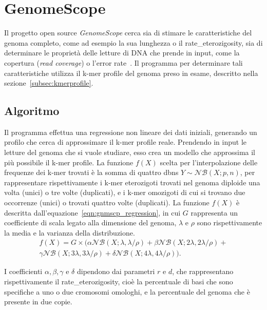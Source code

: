 \documentclass[crop=false, class=book]{standalone}
\begin{document}
	\section{GenomeScope}
	\label{sec:GenomeScope}
	Il progetto open source \textit{GenomeScope} cerca sia di stimare le caratteristiche del genoma completo, come ad esempio la sua lunghezza o il \gls{rate_eterozigosity}, sia di determinare le proprietà delle letture di DNA che prende in input, come la copertura (\textit{read coverage}) o l'error rate~\cite{vurture2017genomescope}. Il programma per determinare tali caratteristiche utilizza il k-mer profile del genoma preso in esame, descritto nella sezione~\vref{subsec:kmerprofile}.
		
	\subsection{Algoritmo}
	Il programma effettua una regressione non lineare dei dati iniziali, generando un profilo che cerca di approssimare il k-mer profile reale. Prendendo in input le letture del genoma che si vuole studiare, esso crea un modello che approssima il più possibile il k-mer profile. La funzione $f(X)$ scelta per l'interpolazione delle frequenze dei k-mer trovati è la somma di quattro \glspl{dbn} $Y \sim \mathcal{NB}(X;p,n)$, per rappresentare rispettivamente i k-mer eterozigoti trovati nel genoma diploide una volta (unici) o tre volte (duplicati), e i k-mer omozigoti di cui si trovano due occorrenze (unici) o trovati quattro volte (duplicati). La funzione $f(X)$ è descritta dall'equazione~\vref{eqn:gnmscp_regression}, in cui $G$ rappresenta un coefficiente di scala legato alla dimensione del genoma, $\lambda$ e $\rho$ sono rispettivamente la media e la varianza della distribuzione.
	\begin{multline}
		f(X) = G \times (\alpha \mathcal{NB}(X;\lambda, \lambda/\rho) + \beta \mathcal{NB}(X;2\lambda, 2\lambda/\rho) + \\
		\gamma \mathcal{NB}(X;3\lambda, 3\lambda/\rho) + \delta \mathcal{NB}(X;4\lambda, 4\lambda/\rho)  ).	
		\label{eqn:gnmscp_regression}
	\end{multline}

	I coefficienti $\alpha, \beta, \gamma$ e $\delta$ dipendono dai parametri $r$ e $d$, che rappresentano rispettivamente il \gls{rate_eterozigosity}, cioè la percentuale di basi che sono specifiche a uno o due cromosomi omologhi, e la percentuale del genoma che è presente in due copie.
	
\end{document}

